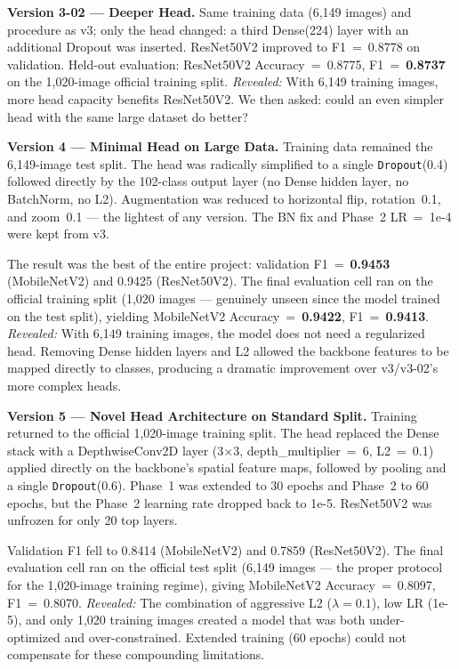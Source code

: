 \documentclass[conference]{IEEEtran}
\begin{document}
\textbf{Version 3-02 — Deeper Head.}
Same training data (6,149 images) and procedure as v3; only the head
changed: a third Dense(224) layer with an additional Dropout was
inserted. ResNet50V2 improved to F1~=~0.8778 on validation.
Held-out evaluation: ResNet50V2 Accuracy~=~0.8775,
F1~=~\textbf{0.8737} on the 1,020-image official training split.
\textit{Revealed:} With 6,149 training images, more head capacity
benefits ResNet50V2. We then asked: could an even simpler head with
the same large dataset do better?

\textbf{Version 4 — Minimal Head on Large Data.}
Training data remained the 6,149-image test split. The head was
radically simplified to a single \texttt{Dropout}(0.4) followed
directly by the 102-class output layer (no Dense hidden layer, no
BatchNorm, no L2). Augmentation was reduced to horizontal flip,
rotation~0.1, and zoom~0.1 — the lightest of any version. The BN
fix and Phase~2 LR~=~1e-4 were kept from v3.

The result was the best of the entire project: validation F1~=~\textbf{0.9453}
(MobileNetV2) and 0.9425 (ResNet50V2). The final evaluation cell ran
on the official training split (1,020 images — genuinely unseen since
the model trained on the test split), yielding MobileNetV2
Accuracy~=~\textbf{0.9422}, F1~=~\textbf{0.9413}.
\textit{Revealed:} With 6,149 training images, the model does not need
a regularized head. Removing Dense hidden layers and L2 allowed
the backbone features to be mapped directly to classes, producing a
dramatic improvement over v3/v3-02's more complex heads.

\textbf{Version 5 — Novel Head Architecture on Standard Split.}
Training returned to the official 1,020-image training split.
The head replaced the Dense stack with a DepthwiseConv2D layer
(3$\times$3, depth\_multiplier~=~6, L2~=~0.1) applied directly on
the backbone's spatial feature maps, followed by pooling and a single
\texttt{Dropout}(0.6). Phase~1 was extended to 30 epochs and Phase~2
to 60 epochs, but the Phase~2 learning rate dropped back to 1e-5.
ResNet50V2 was unfrozen for only 20 top layers.

Validation F1 fell to 0.8414 (MobileNetV2) and 0.7859 (ResNet50V2).
The final evaluation cell ran on the official test split (6,149
images — the proper protocol for the 1,020-image training regime),
giving MobileNetV2 Accuracy~=~0.8097, F1~=~0.8070.
\textit{Revealed:} The combination of aggressive L2 ($\lambda=0.1$),
low LR (1e-5), and only 1,020 training images created a model
that was both under-optimized and over-constrained. Extended training
(60 epochs) could not compensate for these compounding limitations.
\end{document}
